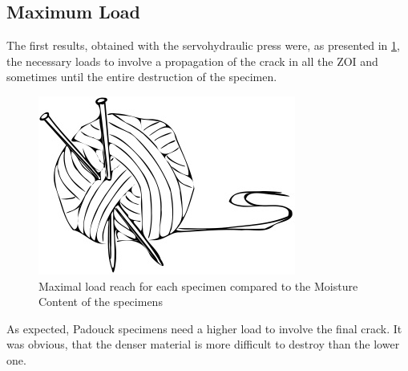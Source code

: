 \documentclass[3p,times,procedia]{elsarticle}
\begin{document}
\subsection{Maximum Load}\label{S:pdcurves}

The first results, obtained with the servohydraulic press were, as presented in \ref{fig:Res_Pmax}, the necessary loads to involve a propagation of the crack in all the ZOI and sometimes until the entire destruction of the specimen.

\begin{figure}[th]
	\centering
	\includegraphics[width=\textwidth]{Figures/example}
	\caption[Maximal load reach for each specimen]{Maximal load reach for each specimen compared to the Moisture Content of the specimens}
	\label{fig:Res_Pmax}
\end{figure}

As expected, Padouck specimens need a higher load to involve the final crack. It was obvious, that the denser material is more difficult to destroy than the lower one.

\end{document}
